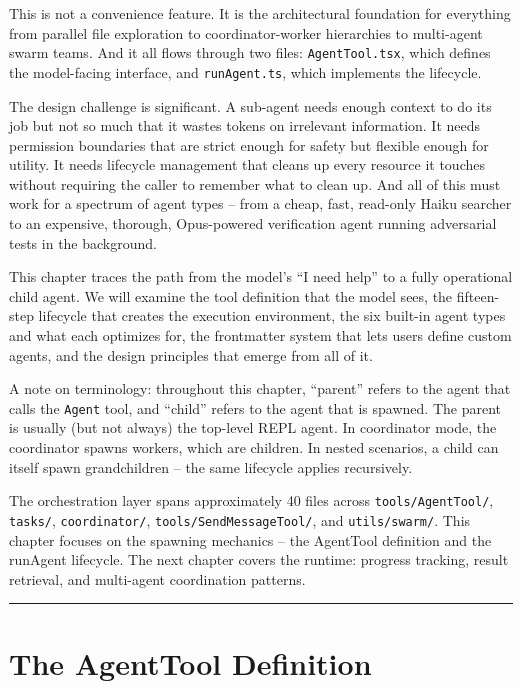\documentclass[
  english,
  11pt,
  letterpaper,
]{book}
\begin{document}
This is not a convenience feature. It is the architectural foundation
for everything from parallel file exploration to coordinator-worker
hierarchies to multi-agent swarm teams. And it all flows through two
files: \texttt{AgentTool.tsx}, which defines the model-facing interface,
and \texttt{runAgent.ts}, which implements the lifecycle.

The design challenge is significant. A sub-agent needs enough context to
do its job but not so much that it wastes tokens on irrelevant
information. It needs permission boundaries that are strict enough for
safety but flexible enough for utility. It needs lifecycle management
that cleans up every resource it touches without requiring the caller to
remember what to clean up. And all of this must work for a spectrum of
agent types -- from a cheap, fast, read-only Haiku searcher to an
expensive, thorough, Opus-powered verification agent running adversarial
tests in the background.

This chapter traces the path from the model's ``I need help'' to a fully
operational child agent. We will examine the tool definition that the
model sees, the fifteen-step lifecycle that creates the execution
environment, the six built-in agent types and what each optimizes for,
the frontmatter system that lets users define custom agents, and the
design principles that emerge from all of it.

A note on terminology: throughout this chapter, ``parent'' refers to the
agent that calls the \texttt{Agent} tool, and ``child'' refers to the
agent that is spawned. The parent is usually (but not always) the
top-level REPL agent. In coordinator mode, the coordinator spawns
workers, which are children. In nested scenarios, a child can itself
spawn grandchildren -- the same lifecycle applies recursively.

The orchestration layer spans approximately 40 files across
\texttt{tools/AgentTool/}, \texttt{tasks/}, \texttt{coordinator/},
\texttt{tools/SendMessageTool/}, and \texttt{utils/swarm/}. This chapter
focuses on the spawning mechanics -- the AgentTool definition and the
runAgent lifecycle. The next chapter covers the runtime: progress
tracking, result retrieval, and multi-agent coordination patterns.

\begin{center}\rule{0.5\linewidth}{0.5pt}\end{center}

\section{The AgentTool Definition}\label{the-agenttool-definition}
\end{document}
